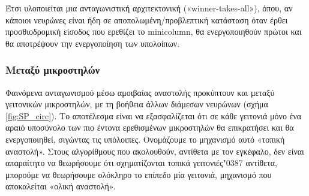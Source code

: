 {  Έτσι υλοποιείται μια ανταγωνιστική αρχιτεκτονική («winner-takes-all»), όπου,
	αν κάποιοι νευρώνες είναι ήδη σε αποπολωμένη/προβλεπτική κατάσταση όταν έρθει προσθιοδρομική είσοδος που ερεθίζει το minicolumn,
	θα ενεργοποιηθούν πρώτοι και θα αποτρέψουν την ενεργοποίηση των υπολοίπων.

	\subsubsection{Μεταξύ μικροστηλών} \label{htm:sp_inhibition}

	Φαινόμενα ανταγωνισμού μέσω αμοιβαίας αναστολής προκύπτουν και μεταξύ γειτονικών μικροστηλών, με τη βοήθεια άλλων διάμεσων νευρώνων (σχήμα \ref{fig:SP_circ}).
	Το αποτέλεσμα είναι να εξασφαλίζεται ότι σε κάθε γειτονιά μόνο ένα αραιό υποσύνολο των πιο έντονα ερεθισμένων μικροστηλών θα επικρατήσει
	και θα ενεργοποιηθεί, σιγώντας τις υπόλοιπες.
	Ονομάζουμε το μηχανισμό αυτό «τοπική αναστολή».
	Στους αλγορίθμους που ακολουθούν, αντίθετα με τον εγκέφαλο, δεν είναι απαραίτητο να θεωρήσουμε ότι σχηματίζονται τοπικά γειτονιές\char"0387
	αντίθετα, μπορούμε να θεωρήσουμε ολόκληρο το επίπεδο μία γειτονιά, μηχανισμό που αποκαλείται «ολική αναστολή».
	}

